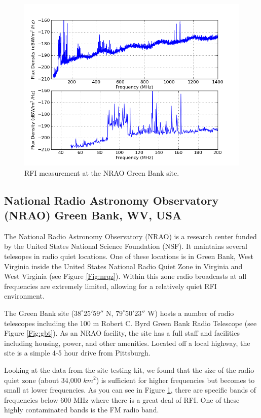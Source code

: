 \begin{figure}[htb]
\begin{center}
\includegraphics[width=0.9\linewidth]{RFI_testing/figures/GBT_cal.png}
\caption{RFI measurement at the NRAO Green Bank site. }
\label{Fig:gbtrfi}
\end{center}
\end{figure}

\subsection{National Radio Astronomy Observatory (NRAO) Green Bank, WV, USA}

The National Radio Astronomy Observatory (NRAO) is a research center funded by the United States National Science Foundation (NSF). It maintains several telesopes in radio quiet locations. One of these locations is in Green Bank, West Virginia inside the United States National Radio Quiet Zone in Virginia and West Virginia (see Figure \ref{Fig:nrqz}). Within this zone radio broadcasts at all frequencies are extremely limited, allowing for a relatively quiet RFI environment. 

The Green Bank site ($38^\circ 25' 59''$ N, $79^\circ 50' 23''$ W) hosts a number of radio telescopes including the 100 m Robert C. Byrd Green Bank Radio Telescope (see Figure \ref{Fig:gbt}). As an NRAO facility, the site has a full staff and facilities including housing, power, and other amenities. Located off a local highway, the site is a simple 4-5 hour drive from Pittsburgh. 

Looking at the data from the site testing kit, we found that the size of the radio quiet zone (about 34,000 $km^2$) is sufficient for higher frequencies but becomes to small at lower frequencies. As you can see in Figure \ref{Fig:gbtrfi}, there are specific bands of frequencies below 600 MHz where there is a great deal of RFI. One of these highly contaminated bands is the FM radio band. 

